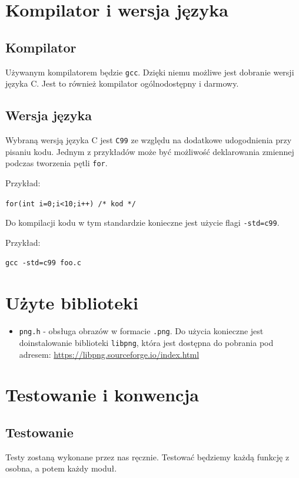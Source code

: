 \documentclass[a4paper,12pt]{article}
\begin{document}
\section{Kompilator i wersja języka}
\subsection{Kompilator}
Używanym kompilatorem będzie \texttt{gcc}. Dzięki niemu możliwe jest dobranie wersji języka C. Jest to również kompilator ogólnodostępny i darmowy.
\subsection{Wersja języka}
Wybraną wersją języka C jest \texttt{C99} ze względu na dodatkowe udogodnienia przy pisaniu kodu. Jednym z przykładów może być możliwość deklarowania zmiennej podczas tworzenia pętli \texttt{for}.

\noindent
Przykład:
\begin{center} 
\texttt{for(int i=0;i<10;i++) /* kod */}
\end{center}

Do kompilacji kodu w tym standardzie konieczne jest użycie flagi \texttt{-std=c99}.

\noindent
Przykład:
\begin{center}
\texttt{gcc -std=c99 foo.c}
\end{center}

\section{Użyte biblioteki}
\begin{itemize}
\item \texttt{png.h} - obsługa obrazów w formacie \texttt{.png}. Do użycia konieczne jest doinstalowanie biblioteki \texttt{libpng}, która jest dostępna do pobrania pod adresem: \url{https://libpng.sourceforge.io/index.html}
\end{itemize}

\section{Testowanie i konwencja}
\subsection{Testowanie}
Testy zostaną wykonane przez nas ręcznie. Testować będziemy każdą funkcję z osobna, a potem każdy moduł. 
\end{document}
